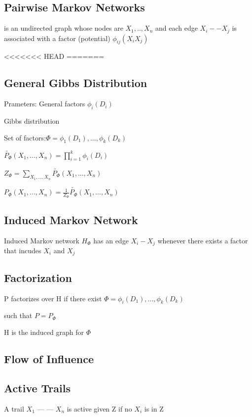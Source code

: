 \documentclass{book}
\begin{document}
\subsection{Pairwise Markov Networks}

is an undirected graph whose nodes are $X_1,..,X_n$ and each edge $X_i -- X_j$ is associated with a factor (potential) $\phi_{ij}(X_i X_j)$

<<<<<<< HEAD
=======
\subsection{General Gibbs Distribution}
Prameters: General factors $\phi_i(D_i)$

Gibbs distribution

Set of factors:$\Phi = { \phi_1(D_1), ..., \phi_k(D_k)}$

$\widetilde{P_{\Phi}}(X_1,..., X_n) = \prod_{i=1}^{k} \phi_i(D_i)$

$Z_{\Phi} = \sum_{X_1,...,X_n} \widetilde{P_{\Phi}}(X_1,...,X_n)$

$P_{\Phi}(X_1,..., X_n) = \frac{1}{Z_{\Phi}}  \widetilde{P_{\Phi}}(X_1,..., X_n) $



\subsection{Induced Markov Network}
Induced Markov network $H_{\Phi}$ has an edge $X_i - X_j$ whenever there exists a factor that incudes $X_i$ and $X_j$

\subsection{Factorization}
P factorizes over H if there exist $\Phi={\phi_i(D_1), ..., \phi_k(D_k)}$ 


such that $P = P_\Phi$

H is the induced graph for $\Phi$

\subsection{Flow of Influence}

\subsection{Active Trails}

A trail $X_1$ --- --- $X_n$ is active given Z if no $X_i$ is in Z
\end{document}
